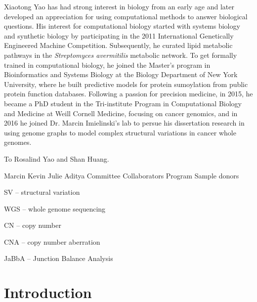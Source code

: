 \documentclass[phd,tocprelim]{cornell}
\begin{document}
\begin{biosketch}
Xiaotong Yao has had strong interest in biology from an early age and later developed an appreciation for using computational methods to answer biological questions. His interest for computational biology started with systems biology and synthetic biology by participating in the 2011 International Genetically Engineered Machine Competition. Subsequently, he curated lipid metabolic pathways in the \textit{Streptomyces avermitilis} metabolic network. To get formally trained in computational biology, he joined the Master's program in Bioinformatics and Systems Biology at the Biology Department of New York University, where he built predictive models for protein sumoylation from public protein function databases. Following a passion for precision medicine, in 2015, he became a PhD student in the Tri-institute Program in Computational Biology and Medicine at Weill Cornell Medicine, focusing on cancer genomics, and in 2016 he joined Dr. Marcin Imielinski's lab to persue his dissertation research in using genome graphs to model complex structural variations in cancer whole genomes.
\end{biosketch}

\begin{dedication}
To Rosalind Yao and Shan Huang.
\end{dedication}

\begin{acknowledgements}
Marcin
Kevin
Julie
Aditya
Committee
Collaborators
Program
Sample donors
\end{acknowledgements}

\contentspage
\tablelistpage
\figurelistpage
\abbrlist

SV -- structural variation

WGS -- whole genome sequencing

CN -- copy number

CNA -- copy number aberration

JaBbA -- Junction Balance Analysis

\symlist

\normalspacing \setcounter{page}{1} 
\pagestyle{cornell} \addtolength{\parskip}{0.5\baselineskip}

\chapter{Introduction}
\end{document}
